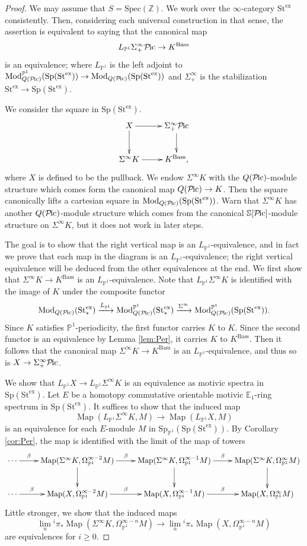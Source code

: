 \documentclass{amsart}
\theoremstyle{plain}
\theoremstyle{definition}
\theoremstyle{remark}
\numberwithin{equation}{theorem}
\newcommand{\mbb}[1]{\mathbb{#1}}
\newcommand{\Bass}{\mathrm{Bass}}
\newcommand{\Mod}{\mathrm{Mod}}
\newcommand{\Sp}{\mathrm{Sp}}
\newcommand{\Spec}{\mathrm{Spec}}
\newcommand{\St}{\mathrm{St}}
\newcommand{\ex}{\mathrm{ex}}
\newcommand{\OmegaP}{\Omega_{\mathbb{P}^1}}
\newcommand{\SpP}{\mathrm{Sp}_{\mathbb{P}^1}}
\newcommand{\Pic}{{\mathcal{P}\mspace{-2.0mu}\mathrm{ic}}}
\newcommand{\Map}{\operatorname{Map}}
\begin{document}
\begin{proof}
We may assume that $S=\Spec(\mbb{Z})$.
We work over the $\infty$-category $\St^\ex$ consistently.
Then, considering each universal construction in that sense, the assertion is equivalent to saying that the canonical map
\[
	L_{\mbb{P}^1}\Sigma^\infty_+\Pic \to K^\Bass
\]
is an equivalence; where $L_{\mbb{P}^1}$ is the left adjoint to $\Mod_{Q(\Pic)}^{\mbb{P}^1}(\Sp(\St^\ex))\to\Mod_{Q(\Pic)}(\Sp(\St^\ex))$ and $\Sigma^\infty_+$ is the stabilization $\St^\ex\to\Sp(\St^\ex)$.

We consider the square in $\Sp(\St^\ex)$.
\[
\xymatrix{
	X \ar[r] \ar[d] & \Sigma^\infty_+\Pic \ar[d] \\
	\Sigma^\infty K \ar[r] & K^\Bass,
}
\]
where $X$ is defined to be the pullback.
We endow $\Sigma^\infty K$ with the $Q(\Pic)$-module structure which comes form the canonical map $Q(\Pic)\to K$.
Then the square canonically lifts a cartesian square in $\Mod_{Q(\Pic)}(\Sp(\St^\ex))$.
Warn that $\Sigma^\infty K$ has another $Q(\Pic)$-module structure which comes from the canonical $\mbb{S}[\Pic]$-module structure on $\Sigma^\infty K$, but it does not work in later steps.

The goal is to show that the right vertical map is an $L_{\mbb{P}^1}$-equivalence, and in fact we prove that each map in the diagram is an $L_{\mbb{P}^1}$-equivalence; the right vertical equivalence will be deduced from the other equivalences at the end.
We first show that $\Sigma^\infty K\to K^\Bass$ is an $L_{\mbb{P}^1}$-equivalence.
Note that $L_{\mbb{P}^1}\Sigma^\infty K$ is identified with the image of $K$ under the composite functor
\[
	\Mod_{Q(\Pic)}(\St^\ex_*)
		\xrightarrow{L_{\mbb{P}^1}} \Mod_{Q(\Pic)}^{\mbb{P}^1}(\St^\ex_*)
			\xrightarrow{\Sigma^\infty} \Mod_{Q(\Pic)}^{\mbb{P}^1}(\Sp(\St^\ex)).
\]
Since $K$ satisfies $\mbb{P}^1$-periodicity, the first functor carries $K$ to $K$.
Since the second functor is an equivalence by Lemma \ref{lem:Per}, it carries $K$ to $K^\Bass$.
Then it follows that the canonical map $\Sigma^\infty K\to K^\Bass$ is an $L_{\mbb{P}^1}$-equivalence, and thus so is $X\to\Sigma^\infty_+\Pic$.

We show that $L_{\mbb{P}^1}X\to L_{\mbb{P}^1}\Sigma^\infty K$ is an equivalence as motivic spectra in $\Sp(\St^\ex)$.
Let $E$ be a homotopy commutative orientable motivic $\mbb{E}_1$-ring spectrum in $\Sp(\St^\ex)$.
It suffices to show that the induced map
\[
	\Map(L_{\mbb{P}^1}\Sigma^\infty K,M) \to \Map(L_{\mbb{P}^1}X,M)
\]
is an equivalence for each $E$-module $M$ in $\SpP(\Sp(\St^\ex))$.
By Corollary \ref{cor:Per}, the map is identified with the limit of the map of towers
\[
\xymatrix{
	\cdots \ar[r]^-\beta & \Map(\Sigma^\infty K,\OmegaP^{\infty-2}M) \ar[r]^-\beta \ar[d] &
		\Map(\Sigma^\infty K,\OmegaP^{\infty-1}M) \ar[r]^-\beta \ar[d] & \Map(\Sigma^\infty K,\OmegaP^\infty M) \ar[d] \\
	\cdots \ar[r]^-\beta & \Map(X,\OmegaP^{\infty-2}M) \ar[r]^-\beta &
		\Map(X,\OmegaP^{\infty-1}M) \ar[r]^-\beta & \Map(X,\OmegaP^\infty M) \\
}
\]
Little stronger, we show that the induced maps
\[
	\lim_n\!{}^i\pi_*\Map(\Sigma^\infty K,\OmegaP^{\infty-n}M) \to \lim_n\!{}^i\pi_*\Map(X,\OmegaP^{\infty-n}M)
\]
are equivalences for $i\ge 0$.


\end{proof}
\end{document}
